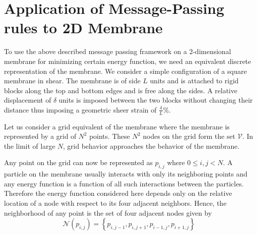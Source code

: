 \documentclass[journal, onecolumn]{IEEEtran}
\begin{document}
\section{Application of Message-Passing rules to 2D Membrane}
\label{Section:Application of Message-Passing rules to 2D Membrane}
To use the above described message passing framework on a 2-dimensional membrane for minimizing certain energy function, we need an equivalent discrete representation
of the membrane. We consider a simple configuration of a square membrane in shear. The membrane is of side $L$ units and is attached to rigid blocks
 along the top and bottom edges and is free along the sides. A relative displacement of $\delta$ units is imposed between the two blocks without changing their distance thus imposing a geometric sheer strain of $\frac{\delta}{L}$\%.

Let us consider a grid equivalent of the membrane where the membrane is represented by a grid of $N^{2}$ points. These $N^{2}$ nodes on the grid form  the set $\mathcal{V}$. In the limit of large $N$, grid behavior approaches the behavior of the membrane.

Any point on the grid can now be represented as $p_{i,j}$ where $0\leq i,j < N$. A particle on the membrane usually interacts with only its neighboring points and any energy function is a function of all such interactions between the particles. Therefore the  energy function considered here depends only on the relative location of a node with respect to its four adjacent neighbors. Hence, the neighborhood of any point is the set of four adjacent nodes given by
\begin{equation}
\mathcal{N}(p_{i,j})=\left\{p_{i,j-1},p_{i,j+1},p_{i-1,j},p_{i+1,j}  \right\}
\label{Eqn:Neighborhood}
\end{equation}
\end{document}
